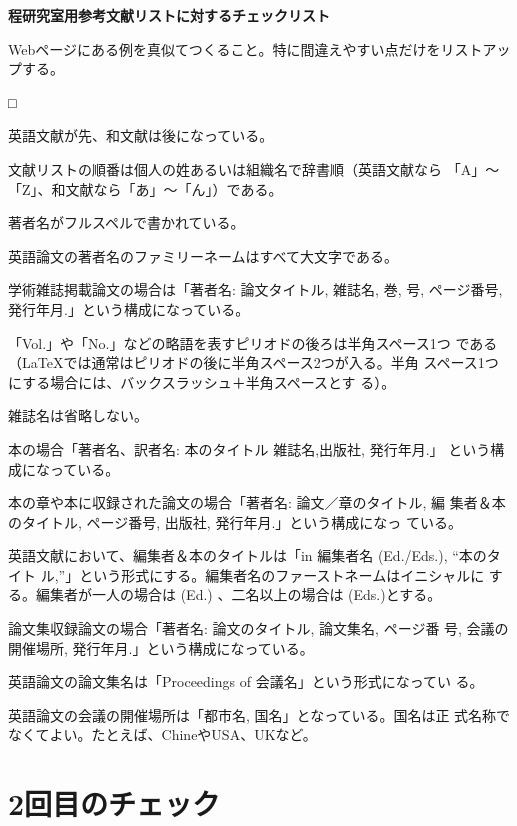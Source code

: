 \documentclass[11pt,a4j]{jsarticle}
\begin{document}
\begin{flushleft}
 {\bf 程研究室用参考文献リストに対するチェックリスト}
\end{flushleft}
Webページにある例を真似てつくること。特に間違えやすい点だけをリストアッ
プする。
\begin{list}%
 {□} %
 {} %
 \item 英語文献が先、和文献は後になっている。
 \item 文献リストの順番は個人の姓あるいは組織名で辞書順（英語文献なら
       「A」〜「Z」、和文献なら「あ」〜「ん」）である。
 \item 著者名がフルスペルで書かれている。
 \item 英語論文の著者名のファミリーネームはすべて大文字である。
 \item 学術雑誌掲載論文の場合は「著者名: 論文タイトル, 雑誌名, 巻, 号,
       ページ番号, 発行年月.」という構成になっている。
 \item 「Vol.」や「No.」などの略語を表すピリオドの後ろは半角スペース1つ
       である（LaTeXでは通常はピリオドの後に半角スペース2つが入る。半角
       スペース1つにする場合には、バックスラッシュ＋半角スペースとす
       る）。
 \item 雑誌名は省略しない。
 \item 本の場合「著者名、訳者名: 本のタイトル 雑誌名,出版社, 発行年月.」
       という構成になっている。
 \item 本の章や本に収録された論文の場合「著者名: 論文／章のタイトル, 編
       集者＆本のタイトル, ページ番号, 出版社, 発行年月.」という構成になっ
       ている。
 \item 英語文献において、編集者＆本のタイトルは「in 編集者名 (Ed./Eds.), ``本のタイト
       ル,''」という形式にする。編集者名のファーストネームはイニシャルに
       する。編集者が一人の場合は (Ed.) 、二名以上の場合は (Eds.)とする。
 \item 論文集収録論文の場合「著者名: 論文のタイトル, 論文集名, ページ番
       号, 会議の開催場所, 発行年月.」という構成になっている。
 \item 英語論文の論文集名は「Proceedings of 会議名」という形式になってい
       る。
 \item 英語論文の会議の開催場所は「都市名, 国名」となっている。国名は正
       式名称でなくてよい。たとえば、ChineやUSA、UKなど。
\end{list}


\section{2回目のチェック}
\end{document}
